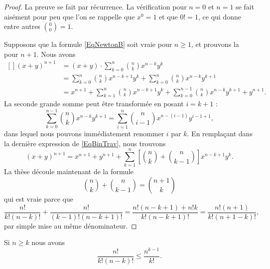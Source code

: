 \begin{proof}
	La preuve se fait par récurrence. La vérification pour \( n=0\) et \( n=1\) se fait aisément pour peu que l'on se rappelle que \( x^0=1\) et que \( 0!=1\), ce qui donne entre autres \( {0\choose 0}=1\).

	Supposons que la formule \eqref{EqNewtonB} soit vraie pour \( n\geq1\), et prouvons la pour \( n+1\). Nous avons
	\begin{equation}        \label{EqBinTrav}
		\begin{aligned}[]
			(x+y)^{n+1} & = (x+y)\cdot \sum_{k=0}^n{n\choose k}x^{n-k}y^k                                                     \\
			            & = \sum_{k=0}^n{n\choose k}x^{n-k+1}y^k+\sum_{k=0}^n{n\choose k}x^{n-k}y^{k+1}                       \\
			            & = x^{n+1}+ \sum_{k=1}^n{n\choose k}x^{n-k+1}y^k+\sum_{k=0}^{n-1}{n\choose k}x^{n-k}y^{k+1}+y^{n+1}.
		\end{aligned}
	\end{equation}
	La seconde grande somme peut être transformée en posant \( i=k+1\) :
	\begin{equation}
		\sum_{k=0}^{n-1}{n\choose k}x^{n-k}y^{k+1} = \sum_{i=1}^n{n\choose i-1}x^{n-(i-1)}y^{i-1+1},
	\end{equation}
	dans lequel nous pouvons immédiatement renommer \( i\) par \( k\). En remplaçant dans la dernière expression de \eqref{EqBinTrav}, nous trouvons
	\begin{equation}
		(x+y)^{n+1}=x^{n+1}+y^{n+1}+\sum_{k=1}^n\left[ {n\choose k}+{n\choose k-1} \right]x^{n-k+1}y^k.
	\end{equation}
	La thèse découle maintenant de la formule
	\begin{equation}
		{n\choose k}+{n\choose k-1}={n+1\choose k}
	\end{equation}
	qui est vraie parce que
	\begin{equation}
		\frac{ n! }{ k!(n-k)! }+\frac{ n! }{ (k-1)!(n-k+1)! }=\frac{ n!(n-k+1)+n!k }{ k!(n-k+1)! }=\frac{ n!(n+1) }{  k!(n+1-k)!  },
	\end{equation}
	par simple mise au même dénominateur.
\end{proof}

\begin{lemma}        \label{LEMooLPCXooYIzJsD}
	Si \( n\geq k\) nous avons
	\begin{equation}
		\frac{ n! }{ k!(n-k)! }\leq \frac{ n^{k-1} }{ k! }.
	\end{equation}
\end{lemma}

